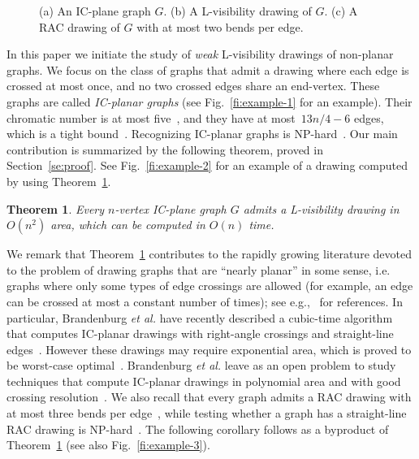 \documentclass[a4paper]{article}
\newtheorem{theorem}{Theorem}
\begin{document}
\begin{figure}[t]
\centering
{}\hfil
{}\hfil
{}
\caption{\small (a) An IC-plane graph $G$. (b) A L-visibility drawing of $G$. (c) A RAC drawing of $G$ with at most two bends per edge.}
\end{figure}

In this paper we initiate the study of {\em weak} L-visibility drawings of non-planar graphs.  We focus on the class of graphs that admit a drawing where each edge is crossed at most once, and no two crossed edges share an end-vertex. These graphs are called \emph{IC-planar graphs} (see  Fig.~\ref{fi:example-1} for an example). Their chromatic number is at most five~\cite{ks-cpgic-JGT10}, and they have at most~$13n/4-6$ edges, which is a tight bound~\cite{zl-spgic-CEJM13}. Recognizing IC-planar graphs is NP-hard~\cite{bdek+-rdicg-15}. Our main contribution is summarized by the following theorem, proved in Section~\ref{se:proof}. See Fig.~\ref{fi:example-2} for an example of a drawing computed by using Theorem~\ref{th:main}.

\begin{theorem}\label{th:main}
Every $n$-vertex IC-plane graph $G$ admits a L-visibility drawing in $O(n^2)$ area, which can be computed in $O(n)$ time.
\end{theorem}

 
We remark that Theorem~\ref{th:main} contributes to the rapidly growing literature devoted to the problem of drawing graphs that are ``nearly planar'' in some sense, i.e. graphs where only some types of edge crossings are allowed (for example, an edge can be crossed at most a constant number of times); see e.g.,~\cite{DBLP:conf/ictcs/Liotta14} for references.  
In particular,  Brandenburg {\em et al.} have recently described a cubic-time algorithm that computes IC-planar drawings with right-angle crossings and straight-line edges~\cite{bdek+-rdicg-15}. However these drawings may require exponential area, which is proved to be worst-case optimal~\cite{bdek+-rdicg-15}.  Brandenburg {\em et al.} leave as an open problem to study techniques that compute IC-planar drawings in polynomial area and with good crossing resolution~\cite{bdek+-rdicg-15}. We also recall that every graph admits a RAC drawing with at most three bends per edge~\cite{DBLP:journals/tcs/DidimoEL11}, while testing whether a graph has a straight-line RAC drawing is NP-hard~\cite{DBLP:journals/jgaa/ArgyriouBS12}. The following corollary follows as a byproduct of Theorem~\ref{th:main} (see also Fig.~\ref{fi:example-3}).
\end{document}
